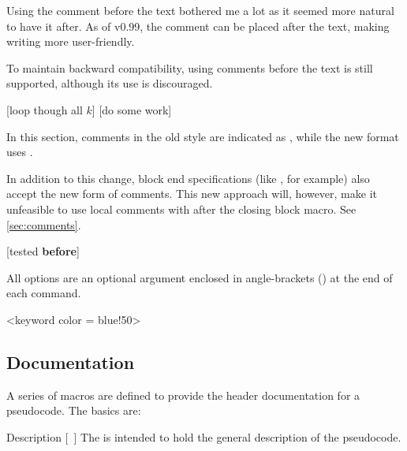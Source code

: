 \documentclass[a4paper, 11pt]{article}
\begin{document}
Using the comment before the text bothered me a lot as it seemed more natural to have it after. As of v0.99, the comment can be placed after the text, making writing more user-friendly.

To maintain backward compatibility, using comments before the text is still supported, although its use is discouraged.

\begin{tcblisting}{}
    \begin{algorithmic}
        [loop though all $k$]
            [do some work]
        \EndWhile
    \end{algorithmic}
\end{tcblisting}

In this section, comments in the old style are indicated as , while the new format uses .

In addition to this change, block end specifications (like , for example) also accept the new form of comments. This new approach will, however, make it unfeasible to use local comments with  after the closing block macro. See \cref{sec:comments}.

\begin{tcblisting}{}
    \begin{algorithmic}
            [tested \textbf{before}]
    \end{algorithmic}
\end{tcblisting}

All options are an optional argument enclosed in angle-brackets (\latexinline{<>}) at the end of each command.

\begin{tcblisting}{}
    \begin{algorithmic}
                <keyword color = blue!50>
            \EndWhile
        \EndIf
    \end{algorithmic}
\end{tcblisting}

\subsection{Documentation}
A series of macros are defined to provide the header documentation for a pseudocode. The basics are:
\begin{macro}{Description}
    [~]
    The  is intended to hold the general description of the pseudocode.
\end{macro}
\end{document}
